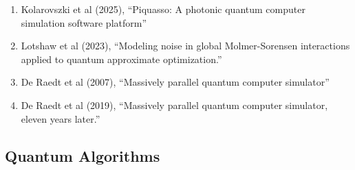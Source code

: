 \documentclass[]{article}
\begin{document}
\begin{enumerate}
\item Kolarovszki et al (2025)\cite{kolarovszki2025piquasso}, ``Piquasso: A photonic quantum computer simulation software platform''
\item Lotshaw et al (2023)\cite{PhysRevA.107.062406}, ``Modeling noise in global Molmer-Sorensen interactions applied to quantum approximate optimization.''
\item De Raedt et al (2007)\cite{de2019massively}, ``Massively parallel quantum computer simulator''
\item De Raedt et al (2019)\cite{de2019massively}, ``Massively parallel quantum computer simulator, eleven years later.''
\end{enumerate}

\subsection{Quantum Algorithms}
\end{document}
